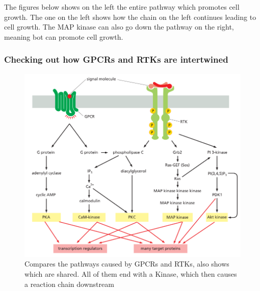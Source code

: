 \documentclass[../main.tex]{subfiles}
\begin{document}
The figures below shows on the left the entire pathway which promotes cell growth. The one on the left shows how the chain on the left continues leading to cell growth. The MAP kinase can also go down the pathway on the right, meaning bot can promote cell growth.
\begin{figure}[H]
	\centering
	\hfill
\end{figure}

\subsubsection{Checking out how GPCRs and RTKs are intertwined}
\begin{figure}[H]
	\centering
	\includegraphics[width=0.5\linewidth]{GPCR_RTK}
	\caption{Compares the pathways caused by GPCRs and RTKs, also shows which are shared. All of them end with a Kinase, which then causes a reaction chain downstream}
\end{figure}
\end{document}
